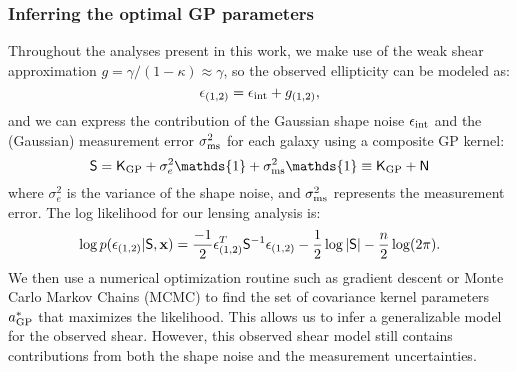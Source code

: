 \subsubsection{Inferring the optimal GP parameters}
\label{subsubsection:optimize_GP_params}
Throughout the analyses present in this work, 
we make use of the weak shear approximation 
$g = \gamma / (1 - \kappa)  \approx \gamma$, so the observed ellipticity can be
modeled as: 
\begin{equation}
	\epsilon_{(1, 2)} = \epsilon_{\rm int} + g_{(1, 2)}, 
	\label{eq:weak_shear_approx}
\end{equation}
and we can express the contribution of the Gaussian shape noise $\epsilon_{\rm int}$
and the (Gaussian) measurement error $\sigma_{\rm ms}^2$
for each galaxy using a composite GP kernel:
\begin{equation}
	\mathsf{S} = \kerngp_{\rm GP} + \sigma_e^2 \mathds{1}  + \sigma_{\rm ms}^2
	\mathds{1}
	\equiv \kerngp_{\rm GP} + \mathsf{N}
	\label{eq:composite_kernel}
\end{equation}
where $\sigma_e^2$ is the variance of the shape noise, and $\sigma_{\rm ms}^2$
represents the measurement error. 
The log likelihood for our lensing analysis is: 
\begin{equation}
	\log p(\epsilon_{(1,2)} | \mathsf{S}, \mathbf{x}) = \frac{-1}{2}\epsilon_{(1,2)}^T \mathsf{S}^{-1}
\epsilon_{(1, 2)}
- \frac{1}{2}\log|\mathsf{S}| - \frac{n}{2}\log(2\pi).
\label{eq:log_marginal_likelihood}
\end{equation}
We then use a numerical optimization routine such as gradient descent or 
Monte Carlo Markov Chains (MCMC)
to find the set of covariance kernel parameters $a_{\rm GP}^*$ that maximizes the
likelihood.
This allows us to infer a generalizable model for the observed shear. However,
this observed shear model still
contains contributions from both the shape noise and the measurement
uncertainties. 

